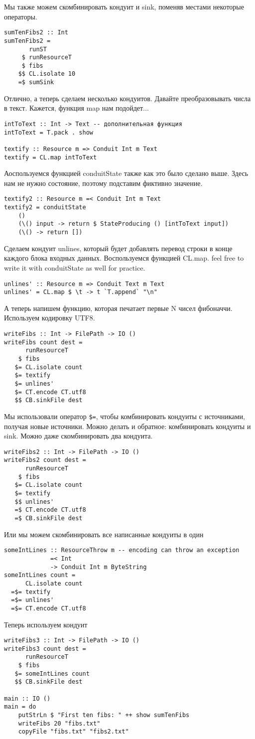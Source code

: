 Мы также можем скомбинировать кондуит и sink, поменяв местами некоторые операторы.
\begin{lstlisting}sumTenFibs2 :: Int
sumTenFibs2 =
       runST
     $ runResourceT
     $ fibs
    $$ CL.isolate 10
    =$ sumSink
\end{lstlisting}
Отлично, а теперь сделаем несколько кондуитов. Давайте преобразовывать числа в текст.
Кажется, функция map нам подойдет...
\begin{lstlisting}
intToText :: Int -> Text -- дополнительная функция 
intToText = T.pack . show

textify :: Resource m => Conduit Int m Text
textify = CL.map intToText
\end{lstlisting}
Аоспользуемся функцией conduitState также как это было сделано выше. Здесь нам не нужно
состояние, поэтому подставим фиктивно значение.
\begin{lstlisting}textify2 :: Resource m =< Conduit Int m Text
textify2 = conduitState
    ()
    (\() input -> return $ StateProducing () [intToText input])
    (\() -> return [])
\end{lstlisting}
Сделаем кондуит unlines, который будет добавлять перевод строки в конце каждого блока
входных данных. Воспользуемся функцией CL.map. feel free to write it with conduitState as
well for practice.
\begin{lstlisting}unlines' :: Resource m => Conduit Text m Text
unlines' = CL.map $ \t -> t `T.append` "\n"
\end{lstlisting}
А теперь напишем функцию, которая печатает первые N чисел фибоначчи. Используем
кодировку UTF8.
\begin{lstlisting}writeFibs :: Int -> FilePath -> IO ()
writeFibs count dest =
      runResourceT
    $ fibs
   $= CL.isolate count
   $= textify
   $= unlines'
   $= CT.encode CT.utf8
   $$ CB.sinkFile dest
\end{lstlisting}
Мы использовали оператор \verb#$=#, чтобы комбинировать кондуиты с источниками, получая
новые источники. Можно делать и обратное: комбинировать кондуиты и sink. Можно даже
скомбинировать два кондуита.
\begin{lstlisting}writeFibs2 :: Int -> FilePath -> IO ()
writeFibs2 count dest =
      runResourceT
    $ fibs
   $= CL.isolate count
   $= textify
   $$ unlines'
   =$ CT.encode CT.utf8
   =$ CB.sinkFile dest
\end{lstlisting}
Или мы можем скомбинировать все написанные кондуиты в один
\begin{lstlisting}someIntLines :: ResourceThrow m -- encoding can throw an exception
             =< Int
             -> Conduit Int m ByteString
someIntLines count =
      CL.isolate count
  =$= textify
  =$= unlines'
  =$= CT.encode CT.utf8
\end{lstlisting}
Теперь используем кондуит
\begin{lstlisting}
writeFibs3 :: Int -> FilePath -> IO ()
writeFibs3 count dest =
      runResourceT
    $ fibs
   $= someIntLines count
   $$ CB.sinkFile dest

main :: IO ()
main = do
    putStrLn $ "First ten fibs: " ++ show sumTenFibs
    writeFibs 20 "fibs.txt"
    copyFile "fibs.txt" "fibs2.txt"
\end{lstlisting}

